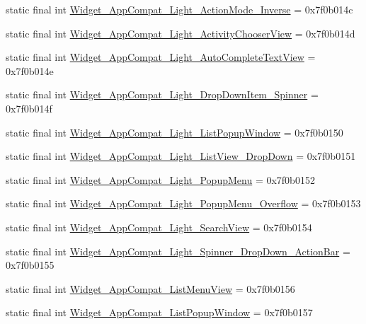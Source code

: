 \begin{CompactItemize}
\item 
static final int \hyperlink{classandroid_1_1support_1_1v7_1_1appcompat_1_1_r_1_1style_0b1afc7578af1769c09d9a9af553c58b}{Widget\_\-AppCompat\_\-Light\_\-ActionMode\_\-Inverse} = 0x7f0b014c
\item 
static final int \hyperlink{classandroid_1_1support_1_1v7_1_1appcompat_1_1_r_1_1style_2ca378c14a23ab0b07f77734a2744489}{Widget\_\-AppCompat\_\-Light\_\-ActivityChooserView} = 0x7f0b014d
\item 
static final int \hyperlink{classandroid_1_1support_1_1v7_1_1appcompat_1_1_r_1_1style_a157dc45f05784417103d799d317c8e6}{Widget\_\-AppCompat\_\-Light\_\-AutoCompleteTextView} = 0x7f0b014e
\item 
static final int \hyperlink{classandroid_1_1support_1_1v7_1_1appcompat_1_1_r_1_1style_68908d342a7b466df468361c52b7adca}{Widget\_\-AppCompat\_\-Light\_\-DropDownItem\_\-Spinner} = 0x7f0b014f
\item 
static final int \hyperlink{classandroid_1_1support_1_1v7_1_1appcompat_1_1_r_1_1style_788d0adb330bfe5b7e57f716f9f362b8}{Widget\_\-AppCompat\_\-Light\_\-ListPopupWindow} = 0x7f0b0150
\item 
static final int \hyperlink{classandroid_1_1support_1_1v7_1_1appcompat_1_1_r_1_1style_7bd58fa0492f92471cacb89112f7d18c}{Widget\_\-AppCompat\_\-Light\_\-ListView\_\-DropDown} = 0x7f0b0151
\item 
static final int \hyperlink{classandroid_1_1support_1_1v7_1_1appcompat_1_1_r_1_1style_3595925eca4fe61163d17e1e375f3919}{Widget\_\-AppCompat\_\-Light\_\-PopupMenu} = 0x7f0b0152
\item 
static final int \hyperlink{classandroid_1_1support_1_1v7_1_1appcompat_1_1_r_1_1style_3e917fcdfae52e00b3b98b4773e812da}{Widget\_\-AppCompat\_\-Light\_\-PopupMenu\_\-Overflow} = 0x7f0b0153
\item 
static final int \hyperlink{classandroid_1_1support_1_1v7_1_1appcompat_1_1_r_1_1style_c5fd4f5382f47fdda2568be822770601}{Widget\_\-AppCompat\_\-Light\_\-SearchView} = 0x7f0b0154
\item 
static final int \hyperlink{classandroid_1_1support_1_1v7_1_1appcompat_1_1_r_1_1style_ef265ef8b02af4d3231ef6b9772ea382}{Widget\_\-AppCompat\_\-Light\_\-Spinner\_\-DropDown\_\-ActionBar} = 0x7f0b0155
\item 
static final int \hyperlink{classandroid_1_1support_1_1v7_1_1appcompat_1_1_r_1_1style_cb57350c83c97457814b07c6aff142c0}{Widget\_\-AppCompat\_\-ListMenuView} = 0x7f0b0156
\item 
static final int \hyperlink{classandroid_1_1support_1_1v7_1_1appcompat_1_1_r_1_1style_2aac9c62f7325fae3691f4e211f44299}{Widget\_\-AppCompat\_\-ListPopupWindow} = 0x7f0b0157

\end{CompactItemize}
